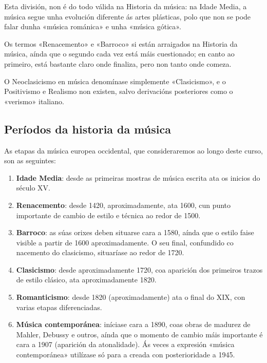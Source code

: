 \documentclass[a4paper, twoside]{templates/ociamthesis}
\providecommand{\tightlist}{%
  \setlength{\itemsep}{0pt}\setlength{\parskip}{0pt}}
\begin{document}
Esta división, non é do todo válida na Historia da música: na Idade Media, a música segue unha evolución diferente ás artes plásticas, polo que non se pode falar dunha «música románica» e unha «música gótica».

Os termos «Renacemento» e «Barroco» si están arraigados na Historia da música, aínda que o segundo cada vez está máis cuestionado; en canto ao primeiro, está bastante claro onde finaliza, pero non tanto onde comeza.

O Neoclasicismo en música denomínase simplemente «Clasicismo», e o Positivismo e Realismo non existen, salvo derivacións posteriores como o «verismo» italiano.

\hypertarget{peruxedodos-da-historia-da-muxfasica}{%
\subsection*{Períodos da historia da música}\label{peruxedodos-da-historia-da-muxfasica}}

As etapas da música europea occidental, que consideraremos ao longo deste curso, son as seguintes:

\begin{enumerate}
\def\labelenumi{\arabic{enumi}.}
\tightlist
\item
  \textbf{Idade Media}: desde as primeiras mostras de música escrita ata os inicios do século XV.
\item
  \textbf{Renacemento}: desde 1420, aproximadamente, ata 1600, cun punto importante de cambio de estilo e técnica ao redor de 1500.
\item
  \textbf{Barroco}: as súas orixes deben situarse cara a 1580, aínda que o estilo faise visible a partir de 1600 aproximadamente. O seu final, confundido co nacemento do clasicismo, situaríase ao redor de 1720.
\item
  \textbf{Clasicismo}: desde aproximadamente 1720, coa aparición dos primeiros trazos de estilo clásico, ata aproximadamente 1820.
\item
  \textbf{Romanticismo}: desde 1820 (aproximadamente) ata o final do XIX, con varias etapas diferenciadas.
\item
  \textbf{Música contemporánea}: iníciase cara a 1890, coas obras de madurez de Mahler, Debussy e outros, aínda que o momento de cambio máis importante é cara a 1907 (aparición da atonalidade). Ás veces a expresión «música contemporánea» utilízase só para a creada con posterioridade a 1945.
\end{enumerate}
\end{document}
